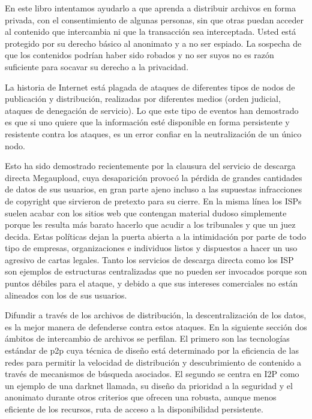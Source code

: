 \documentclass[10pt,a5paper,twoside,,]{book}
\begin{document}
En este libro intentamos ayudarlo a que aprenda a distribuir archivos en
forma privada, con el consentimiento de algunas personas, sin que otras
puedan acceder al contenido que intercambia ni que la transacción sea
interceptada. Usted está protegido por su derecho básico al anonimato y
a no ser espiado. La sospecha de que los contenidos podrían haber sido
robados y no ser suyos no es razón suficiente para socavar su derecho a
la privacidad.

La historia de Internet está plagada de ataques de diferentes tipos de
nodos de publicación y distribución, realizadas por diferentes medios
(orden judicial, ataques de denegación de servicio). Lo que este tipo de
eventos han demostrado es que si uno quiere que la información esté
disponible en forma persistente y resistente contra los ataques, es un
error confiar en la neutralización de un único nodo.

Esto ha sido demostrado recientemente por la clausura del servicio de
descarga directa Megaupload, cuya desaparición provocó la pérdida de
grandes cantidades de datos de sus usuarios, en gran parte ajeno incluso
a las supuestas infracciones de copyright que sirvieron de pretexto para
su cierre. En la misma línea los ISPs suelen acabar con los sitios web
que contengan material dudoso simplemente porque les resulta más barato
hacerlo que acudir a los tribunales y que un juez decida. Estas
políticas dejan la puerta abierta a la intimidación por parte de todo
tipo de empresas, organizaciones e individuos listos y dispuestos a
hacer un uso agresivo de cartas legales. Tanto los servicios de descarga
directa como los ISP son ejemplos de estructuras centralizadas que no
pueden ser invocados porque son puntos débiles para el ataque, y debido
a que sus intereses comerciales no están alineados con los de sus
usuarios.

Difundir a través de los archivos de distribución, la descentralización
de los datos, es la mejor manera de defenderse contra estos ataques. En
la siguiente sección dos ámbitos de intercambio de archivos se perfilan.
El primero son las tecnologías estándar de p2p cuya técnica de diseño
está determinado por la eficiencia de las redes para permitir la
velocidad de distribución y descubrimiento de contenido a través de
mecanismos de búsqueda asociados. El segundo se centra en I2P como un
ejemplo de una darknet llamada, su diseño da prioridad a la seguridad y
el anonimato durante otros criterios que ofrecen una robusta, aunque
menos eficiente de los recursos, ruta de acceso a la disponibilidad
persistente.
\end{document}
